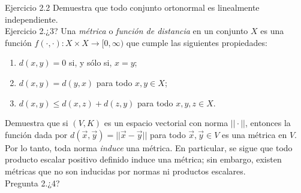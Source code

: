 \documentclass[12pt,dvipsnames]{article}
\numberwithin{equation}{section}
\begin{document}
Ejercicio 2.2 Demuestra que todo conjunto ortonormal es linealmente independiente. \\

Ejercicio 2.¿3? Una \emph{métrica} o \emph{función de distancia} en un conjunto $X$ es una función $f(\cdot, \cdot ):X\times X\to [0,\infty)$ que cumple las siguientes propiedades:
\begin{enumerate}[label=(\roman*)]
    \item $d(x,y)=0$ si, y sólo si, $x=y$;

    \item $d(x,y)=d(y,x)$ para todo $x,y\in X$;

    \item $d(x,y) \le d(x,z) + d(z,y)$ para todo $x,y,z\in X$.
\end{enumerate}

\noindent Demuestra que si $(V,K)$ es un espacio vectorial con norma $||\cdot||$, entonces la función dada por $d(\vec{x},\vec{y})=||\vec{x}-\vec{y}||$ para todo $\vec{x},\vec{y}\in V$ es una métrica en $V$. Por lo tanto, toda norma \emph{induce} una métrica. En particular, se sigue que todo producto escalar positivo definido induce una métrica; sin embargo, existen métricas que no son inducidas por normas ni productos escalares. \\

Pregunta 2.¿4?
\end{document}
